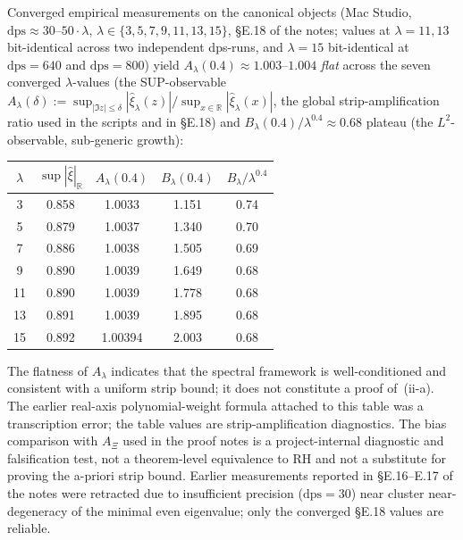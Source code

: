\documentclass[11pt,a4paper]{article}
\theoremstyle{remark}
\theoremstyle{plain}
\begin{document}
Converged empirical measurements on the canonical objects (Mac Studio,
$\mathrm{dps} \approx 30\text{--}50\cdot\lambda$, $\lambda \in
\{3,5,7,9,11,13,15\}$, \S{}E.18 of the notes; values at $\lambda=11,13$
bit-identical across two independent dps-runs, and $\lambda=15$
bit-identical at $\mathrm{dps}=640$ and $\mathrm{dps}=800$) yield
$A_\lambda(0.4) \approx 1.003\text{--}1.004$ \emph{flat} across the
seven converged $\lambda$-values
(the SUP-observable
$A_\lambda(\delta) :=
\sup_{|\Im z|\leq \delta}|\hat\xi_\lambda(z)|/
\sup_{x\in\mathbb{R}}|\hat\xi_\lambda(x)|$, the global
strip-amplification ratio used in the scripts and in \S{}E.18) and
$B_\lambda(0.4)/\lambda^{0.4}
\approx 0.68$ plateau (the $L^2$-observable, sub-generic growth):

\begin{center}
\footnotesize
\renewcommand{\arraystretch}{1.15}
\begin{tabular}{c|c|c|c|c}
$\lambda$ & $\sup|\hat\xi|_{\mathbb{R}}$ & $A_\lambda(0.4)$ & $B_\lambda(0.4)$ & $B_\lambda/\lambda^{0.4}$ \\\hline
 3 & 0.858 & 1.0033 & 1.151 & 0.74 \\
 5 & 0.879 & 1.0037 & 1.340 & 0.70 \\
 7 & 0.886 & 1.0038 & 1.505 & 0.69 \\
 9 & 0.890 & 1.0039 & 1.649 & 0.68 \\
11 & 0.890 & 1.0039 & 1.778 & 0.68 \\
13 & 0.891 & 1.0039 & 1.895 & 0.68 \\
15 & 0.892 & 1.00394 & 2.003 & 0.68
\end{tabular}
\end{center}

The flatness of $A_\lambda$ indicates that the spectral framework is
well-conditioned and consistent with a uniform strip bound; it does not
constitute a proof of~(ii-a).  The earlier real-axis
polynomial-weight formula attached to this table was a transcription
error; the table values are strip-amplification diagnostics.  The
bias comparison with $A_\Xi$ used in the proof notes is a
project-internal diagnostic and falsification test, not a
theorem-level equivalence to RH and not a substitute for proving
the a-priori strip bound.  Earlier measurements reported in
\S{}E.16--E.17 of the notes were retracted due to insufficient
precision ($\mathrm{dps}=30$) near cluster near-degeneracy of the
minimal even eigenvalue; only the converged \S{}E.18 values are
reliable.
\end{document}
